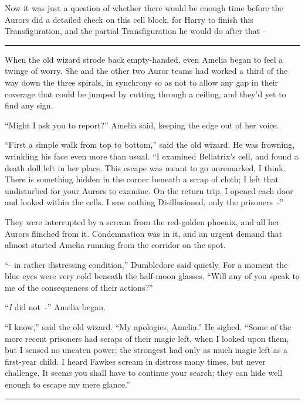 Now it was just a question of whether there would be enough time before the Aurors did a detailed check on this cell block, for Harry to finish this Transfiguration, and the partial Transfiguration he would do after that -

\begin{center}\rule{3in}{0.4pt}\end{center}

When the old wizard strode back empty-handed, even Amelia began to feel a twinge of worry. She and the other two Auror teams had worked a third of the way down the three spirals, in synchrony so as not to allow any gap in their coverage that could be jumped by cutting through a ceiling, and they'd yet to find any sign.

``Might I ask you to report?'' Amelia said, keeping the edge out of her voice.

``First a simple walk from top to bottom,'' said the old wizard. He was frowning, wrinkling his face even more than usual. ``I examined Bellatrix's cell, and found a death doll left in her place. This escape was meant to go unremarked, I think. There is something hidden in the corner beneath a scrap of cloth; I left that undisturbed for your Aurors to examine. On the return trip, I opened each door and looked within the cells. I saw nothing Disillusioned, only the prisoners~-''

They were interrupted by a scream from the red-golden phoenix, and all her Aurors flinched from it. Condemnation was in it, and an urgent demand that almost started Amelia running from the corridor on the spot.

``- in rather distressing condition,'' Dumbledore said quietly. For a moment the blue eyes were very cold beneath the half-moon glasses. ``Will any of you speak to me of the consequences of their actions?''

``\emph{I} did not~-'' Amelia began.

``I know,'' said the old wizard. ``My apologies, Amelia.'' He sighed. ``Some of the more recent prisoners had scraps of their magic left, when I looked upon them, but I sensed no uneaten power; the strongest had only as much magic left as a first-year child. I heard Fawkes scream in distress many times, but never challenge. It seems you shall have to continue your search; they can hide well enough to escape my mere glance.''

\begin{center}\rule{3in}{0.4pt}\end{center}

